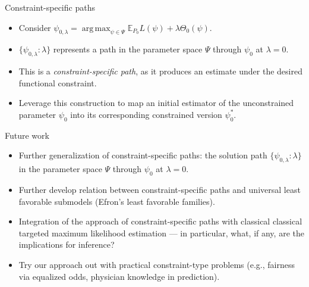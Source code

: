 \documentclass[12pt,t]{beamer}
\newcommand{\E}{\mathbb{E}}
\DeclareMathOperator*{\argmax}{arg\,max}
\begin{document}

\begin{frame}[c]{Constraint-specific paths}

\begin{center}
\begin{itemize}
  \item Consider $\psi_{0, \lambda} = \argmax_{\psi \in \Psi} \E_{P_0}L(\psi) +
    \lambda \Theta_0(\psi)$.
  \item $\{\psi_{0, \lambda} : \lambda\}$ represents a path in the parameter
    space $\Psi$ through $\psi_0$ at $\lambda = 0$.
  \item This is a \textit{constraint-specific path}, as it produces an estimate
    under the desired functional constraint.
  \item Leverage this construction to map an initial estimator of the
    unconstrained parameter $\psi_0$ into its corresponding constrained version
    $\psi_0^*$.
\end{itemize}
\end{center}

\note{
}

\end{frame}


\begin{frame}[c]{Future work}

\begin{center}
\begin{itemize}
  \itemsep12pt
  \item Further generalization of constraint-specific paths: the solution path
    $\{\psi_{0, \lambda}: \lambda\}$ in the parameter space $\Psi$ through
    $\psi_0$ at $\lambda = 0$.
  \item Further develop relation between constraint-specific paths and universal
    least favorable submodels (Efron's least favorable families).
  \item Integration of the approach of constraint-specific paths with classical
    classical targeted maximum likelihood estimation --- in particular, what, if
    any, are the implications for inference?
  \item Try our approach out with practical constraint-type problems (e.g.,
    fairness via equalized odds, physician knowledge in prediction).
\end{itemize}
\end{center}

\note{
}

\end{frame}
\end{document}

